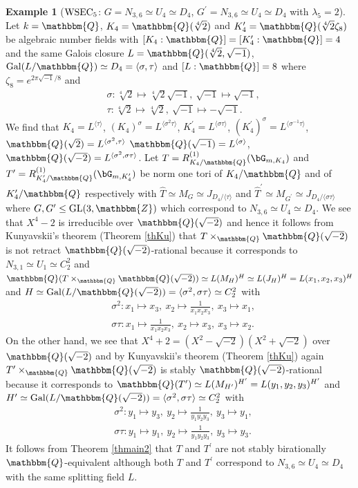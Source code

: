 \documentclass{amsart}
\theoremstyle{plain}
\theoremstyle{definition}
\newtheorem{example}[theorem]{Example}
\theoremstyle{remark}
\newcommand{\bZ}{\mathbbm{Z}}\newcommand{\bQ}{\mathbbm{Q}}
\newcommand{\GL}{{\rm GL}}\newcommand{\SL}{{\rm SL}}
\begin{document}
\begin{example}[${\rm WSEC}_5$: $G=N_{3,6}\simeq U_4\simeq D_4$, $G^\prime=N_{3,6}\simeq U_4\simeq D_4$ with $\lambda_5=2$]\label{ex1.26}
Let $k=\bQ$, $K_4=\bQ(\sqrt[4]{2})$ and 
$K_4^\prime=\bQ(\sqrt[4]{2}\zeta_8)$ be algebraic number fields 
with $[K_4:\bQ]=[K_4^\prime:\bQ]=4$ 
and the same Galois closure $L=\bQ(\sqrt[4]{2},\sqrt{-1})$, 
${\rm Gal}(L/\bQ)\simeq D_4=\langle \sigma,\tau\rangle$ and $[L:\bQ]=8$ 
where $\zeta_8=e^{2\pi\sqrt{-1}/8}$ and 
\begin{align*}
&\sigma: \sqrt[4]{2}\mapsto \sqrt[4]{2}\sqrt{-1},\ \sqrt{-1}\mapsto \sqrt{-1},\\ 
&\tau: \sqrt[4]{2}\mapsto \sqrt[4]{2},\ \sqrt{-1}\mapsto -\sqrt{-1}. 
\end{align*} 
We find that $K_4=L^{\langle\tau\rangle}$, 
$(K_4)^\sigma=L^{\langle\sigma^2\tau\rangle}$, 
$K_4^\prime=L^{\langle\sigma\tau\rangle}$, 
$(K_4^\prime)^\sigma=L^{\langle\sigma^{-1}\tau\rangle}$, 
$\bQ(\sqrt{2})=L^{\langle\sigma^2,\tau\rangle}$
$\bQ(\sqrt{-1})=L^{\langle\sigma\rangle}$, 
$\bQ(\sqrt{-2})=L^{\langle\sigma^2,\sigma\tau\rangle}$. 
Let 
$T=R_{K_4/\bQ}^{(1)}(\bG_{m,K_4})$ and 
$T^\prime=R_{K_4^\prime/\bQ}^{(1)}(\bG_{m,K_4^\prime})$ 
be norm one tori of $K_4/\bQ$ and of $K_4^\prime/\bQ$ respectively 
with $\widehat{T}\simeq M_G\simeq J_{D_4/\langle\tau\rangle}$ 
and $\widehat{T}^\prime\simeq M_{G^\prime}\simeq J_{D_4/\langle\sigma\tau\rangle}$ 
where $G, G^\prime \leq \GL(3,\bZ)$ 
which correspond to $N_{3,6}\simeq U_4\simeq D_4$. 
We see that $X^4-2$ is irreducible over $\bQ(\sqrt{-2})$ and 
hence it follows from Kunyavskii's theorem (Theorem \ref{thKu}) that 
$T\times_\bQ \bQ(\sqrt{-2})$ is not retract $\bQ(\sqrt{-2})$-rational 
because it corresponds to $N_{3,1}\simeq U_1\simeq C_2^2$ and 
$\bQ(T\times_\bQ \bQ(\sqrt{-2}))\simeq L(M_H)^H\simeq L(J_H)^H=L(x_1,x_2,x_3)^H$ and 
$H\simeq {\rm Gal}(L/\bQ(\sqrt{-2}))
=\langle \sigma^2,\sigma\tau\rangle\simeq C_2^2$ 
with 
\begin{align*}
&\sigma^2: x_1\mapsto x_3,\ x_2\mapsto \frac{1}{x_1x_2x_3},\ x_3\mapsto x_1,\\ 
&\sigma\tau: x_1\mapsto \frac{1}{x_1x_2x_3},\ x_2\mapsto x_3,\ x_3\mapsto x_2.
\end{align*}
On the other hand, we see that $X^4+2=(X^2-\sqrt{-2})(X^2+\sqrt{-2})$ 
over $\bQ(\sqrt{-2})$ and by 
Kunyavskii's theorem (Theorem \ref{thKu}) again  
$T^\prime\times_\bQ \bQ(\sqrt{-2})$ is stably $\bQ(\sqrt{-2})$-rational
because it corresponds to 
$\bQ(T^\prime)\simeq L(M_{H^\prime})^{H^\prime}
=L(y_1,y_2,y_3)^{H^\prime}$ and 
$H^\prime\simeq {\rm Gal}(L/\bQ(\sqrt{-2}))=
\langle \sigma^2,\sigma\tau\rangle\simeq C_2^2$ with 
\begin{align*}
&\sigma^2: y_1\mapsto y_3,\ y_2\mapsto \frac{1}{y_1 y_2 y_3},\ 
y_3\mapsto y_1,\\ 
&\sigma\tau: y_1\mapsto y_1,\ y_2\mapsto \frac{1}{y_1 y_2 y_3},\ 
y_3\mapsto y_3.
\end{align*}
It follows from Theorem \ref{thmain2} that 
$T$ and $T^\prime$ are not stably birationally $\bQ$-equivalent 
although both $T$ and $T^\prime$ correspond to $N_{3,6}\simeq U_4\simeq D_4$ 
with the same splitting field $L$. 


\end{example}
\end{document}
